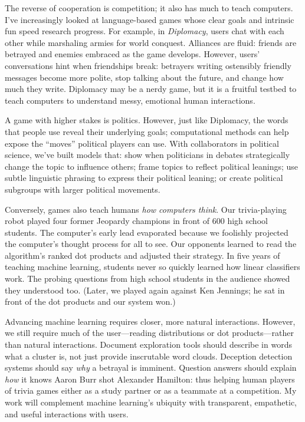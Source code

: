 \documentclass[11pt, amssymb, one column]{article}
\begin{document}
The reverse of cooperation is competition; it also has much to teach
computers. I've increasingly looked at language-based games whose clear goals
and intrinsic fun speed research progress.  For example, in \emph{Diplomacy},
users chat with each other while marshaling armies for world conquest.
Alliances are fluid: friends are betrayed and enemies embraced as the game
develops. However, users' conversations hint when friendships break:
betrayers writing ostensibly friendly messages become more
polite, stop talking about the future, and change how much they
write.  Diplomacy may be a nerdy game, but it is a fruitful
testbed to teach computers to understand messy, emotional human interactions.

A game with higher stakes is politics.  However, just like Diplomacy,
the words that people use reveal their underlying goals; computational
methods can help expose the ``moves'' political players can use.  With
collaborators in political science, we've built models that: show when
politicians in debates strategically change the topic to influence
others; frame topics to reflect political leanings; use subtle
linguistic phrasing to express their political leaning; or create
political subgroups with larger political movements.

Conversely, games also teach humans \emph{how computers think}.  Our
trivia-playing robot played four former Jeopardy champions
in front of 600 high school students. The computer's early
lead evaporated because we foolishly projected the computer's thought process for
all to see.  Our opponents learned to read the algorithm's ranked dot
products and adjusted their strategy. In five years
of teaching machine learning, students never so
quickly learned how linear classifiers work.  The probing questions from
high school students in the audience showed they understood too.
(Later, we played again against Ken Jennings; he sat in front of
the dot products and our system won.)

Advancing machine learning requires closer, more natural interactions.
However, we still require much of the user---reading distributions or
dot products---rather than natural interactions.  Document
exploration tools should describe in words what a cluster is, not just
provide inscrutable word clouds.  Deception detection systems should
say \emph{why} a betrayal is imminent.  Question answers should
explain \emph{how} it knows Aaron Burr shot Alexander Hamilton: thus
helping human players of trivia games either as a study partner or as
a teammate at a competition. My work will complement machine
learning's ubiquity with transparent, empathetic, and useful
interactions with users.
\end{document}
